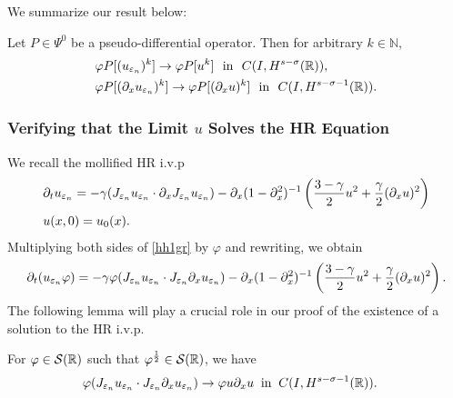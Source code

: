 We summarize our result below:
\begin{proposition}
\label{hhthm:crit1}
Let $P \in \Psi^0$ be a pseudo-differential operator. Then for
arbitrary $k \in \mathbb{N}$, 
\begin{equation}
\begin{split}
& \varphi P [(u_{\varepsilon_n})^k] \to \varphi P [u^k] \ \ \text{in}  \ \ C(I,
H^{s-\sigma }(\mathbb{R})),
\\
& 
\varphi P [(\partial_x u_{\varepsilon_n})^k] \to \varphi P [(\partial_x u)^k] \ \
\text{in}  \ \ C(I,
H^{s-\sigma -1}(\mathbb{R})).
\end{split}
\end{equation}
\end{proposition}
\subsubsection{Verifying that the Limit $u$ Solves the HR Equation} 
We recall the mollified HR i.v.p
\begin{align}
& \partial_t u_{\varepsilon_n}  = -\gamma(J_{\varepsilon_n} u_{\varepsilon_n} \cdot \partial_x
J_{\varepsilon_n} u_{\varepsilon_n}) - \partial_x(1- \partial_x^2)^{-1} \left( \frac{3-\gamma}{2} u^2
+ \frac{\gamma}{2} (\partial_x u)^2 \right ) 
\label{hh1gr}
\\
& u(x,0) = u_0(x).
\label{hh2gr}
\end{align}
Multiplying both sides of \eqref{hh1gr} by $\varphi$ and rewriting,
we obtain
\begin{equation}
\label{hh3}
\begin{split}
\partial_t(u_{\varepsilon_n} \varphi) = -\gamma \varphi (J_{\varepsilon_n} u_{\varepsilon_n} \cdot
J_{\varepsilon_n} \partial_x u_{\varepsilon_n}) - \partial_x(1- \partial_x^2)^{-1} \left( \frac{3-\gamma}{2} u^2
+ \frac{\gamma}{2} (\partial_x u)^2 \right ).
\end{split}
\end{equation}
The following lemma will play a crucial role in our proof of the
existence of a solution to the HR i.v.p.
\begin{lemma}
\label{hhlem:cc}
For $\varphi \in \mathcal{S}(\mathbb{R})$ such that
$\varphi^\frac{1}{2} \in \mathcal{S}(\mathbb{R})$, we have
\begin{equation}
\begin{split}
\label{hhburgers_and_nonlocal_conv}
& \varphi (J_{\varepsilon_n} u_{\varepsilon_n} 
\cdot J_{\varepsilon_n}\partial_x u_{\varepsilon_n}) 
\to \varphi u \partial_x u \; \; 
\text{in} \; \;
C(I, H^{s-\sigma-1}(\mathbb{R})). 
\end{split}
\end{equation}
\end{lemma}
%
